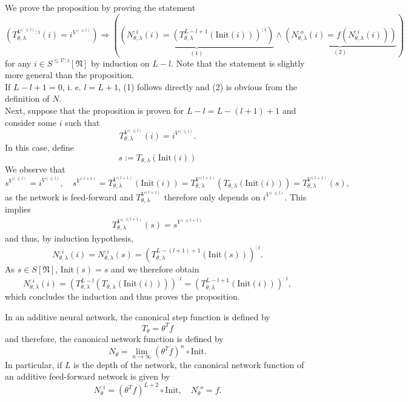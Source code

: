 \documentclass[a4paper,11pt]{report}
\newcommand{\In}{\text{Init}}
\begin{document}
\begin{Bew}
We prove the proposition by proving the statement 
\[
\left(T_{\theta,\lambda}^{V^{(\le l)}:i}(i)=i^{V^{(\le l)}}\right)
\Rightarrow
\left(
\underbrace{\left(
N_{\theta,\lambda}^{:i}(i)=\left(T_{\theta,\lambda}^{L-l+1}\left(\In(i)\right)\right)^{:i}
\right)}_{(1)}
\wedge
\underbrace{\left( 
N_{\theta,\lambda}^{:o}(i)=f\left(N_{\theta,\lambda}^{:i}(i)\right)
\right)}_{(2)}
\right)
\]
for any $i\in S^{\le\mathcal{V}:i}[\mathfrak{N}]$ by induction on $L-l$. Note that the statement is slightly more general than the proposition.\\
If $L-l+1=0$, i. e. $l=L+1$, (1) follows directly and (2) is obvious from the definition of $N$.\\
Next, suppose that the proposition is proven for $L-l=L-(l+1)+1$ and consider some $i$ such that
\[
T_{\theta,\lambda}^{V^{(\le l)}}(i)=i^{V^{(\le l)}}.
\]
In this case, define
\[
s:=T_{\theta,\lambda}\left(\In(i)\right)
\]
We observe that
\[
s^{V^{(\le l)}}=i^{V^{(\le l)}},
\quad
s^{V^{(l+1)}}=T_{\theta,\lambda}^{V^{(l+1)}}\left(\In(i)\right)=T_{\theta,\lambda}^{V^{(l+1)}}\left(T_{\theta,\lambda}\left(\In(i)\right)\right)=T_{\theta,\lambda}^{V^{(l+1)}}(s),
\]
as the network is feed-forward and $T_{\theta,\lambda}^{V^{(l+1)}}$ therefore only depends on $i^{V^{(\le l)}}$. This implies
\begin{align*}
T_{\theta,\lambda}^{V^{(\le l+1)}}(s)=s^{V^{(\le l+1)}}
\end{align*}
and thus, by induction hypothesis, 
\[
N_{\theta,\lambda}^{:i}(i)=N_{\theta,\lambda}^{:i}(s)=\left(T_{\theta,\lambda}^{L-(l+1)+1}\left(\In(s)\right)\right)^{:i}.
\]
As $s\in S[\mathfrak{N}]$, $\In(s)=s$ and we therefore obtain
\[
N_{\theta,\lambda}^{:i}(i)=\left(T_{\theta,\lambda}^{L-l}\left(T_{\theta,\lambda}\left(\In(i)\right)\right)\right)^{:i}=\left(T_{\theta,\lambda}^{L-l+1}\left(\In(i)\right)\right)^{:i},
\]
which concludes the induction and thus proves the proposition.
\end{Bew}

\begin{Par}
In an additive neural network, the canonical step function is defined by
\begin{equation}
T_{\theta}=\theta^Tf
\end{equation}
and therefore, the canonical network function is defined by 
\begin{equation}
N_{\theta}=\lim_{n\to\infty}(\theta^T f)^n\circ\In.
\end{equation}
In particular, if $L$ is the depth of the network, the canonical network function of an additive feed-forward network is given by
\[
N_{\theta}^{:i}=(\theta^T f)^{L+2}\circ\In,
\quad
N_{\theta}^{:o}=f.
\]
\end{Par}
\end{document}
